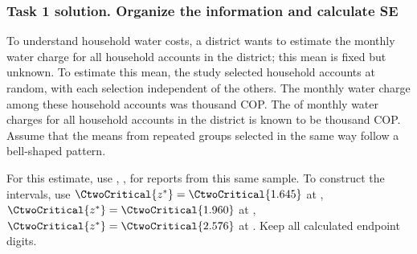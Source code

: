 \subsubsection*{Task 1 solution. Organize the information and calculate SE}
\label{sol:c2-advanced-d-a}
To understand household water costs, a district wants to estimate the  monthly water charge for all household accounts in the district; this mean is fixed but unknown. To estimate this mean, the study selected  household accounts at random, with each selection independent of the others. The  monthly water charge among these  household accounts was  thousand COP. The  of monthly water charges for all household accounts in the district is known to be  thousand COP. Assume that the means from repeated groups selected in the same way follow a bell-shaped pattern.

For this estimate, use , ,   for reports from this same sample. To construct the intervals, use $\CtwoCritical{z^*}=\CtwoCritical{1.645}$ at , $\CtwoCritical{z^*}=\CtwoCritical{1.960}$ at , $\CtwoCritical{z^*}=\CtwoCritical{2.576}$ at . Keep all calculated endpoint digits.

